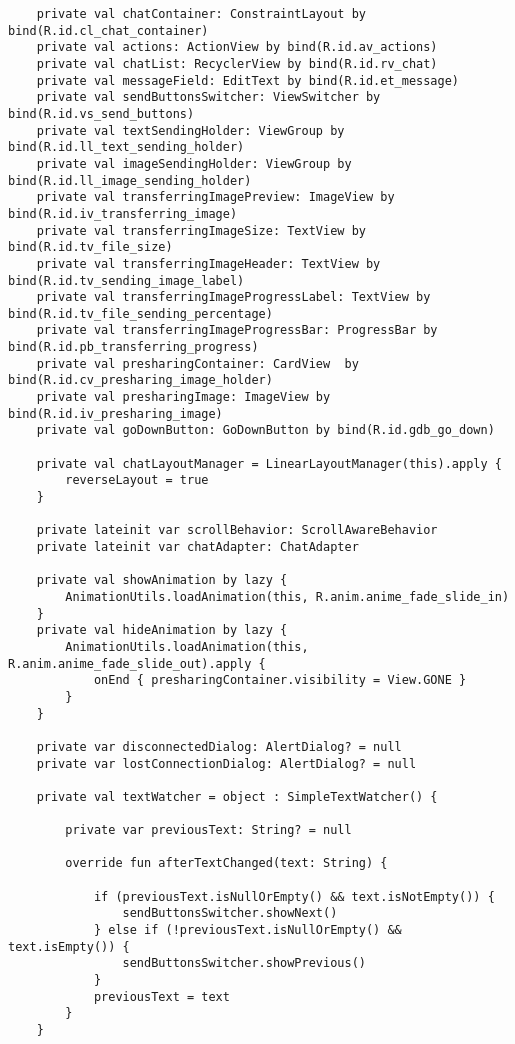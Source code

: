 \begin{lstlisting}
    private val chatContainer: ConstraintLayout by bind(R.id.cl_chat_container)
    private val actions: ActionView by bind(R.id.av_actions)
    private val chatList: RecyclerView by bind(R.id.rv_chat)
    private val messageField: EditText by bind(R.id.et_message)
    private val sendButtonsSwitcher: ViewSwitcher by bind(R.id.vs_send_buttons)
    private val textSendingHolder: ViewGroup by bind(R.id.ll_text_sending_holder)
    private val imageSendingHolder: ViewGroup by bind(R.id.ll_image_sending_holder)
    private val transferringImagePreview: ImageView by bind(R.id.iv_transferring_image)
    private val transferringImageSize: TextView by bind(R.id.tv_file_size)
    private val transferringImageHeader: TextView by bind(R.id.tv_sending_image_label)
    private val transferringImageProgressLabel: TextView by bind(R.id.tv_file_sending_percentage)
    private val transferringImageProgressBar: ProgressBar by bind(R.id.pb_transferring_progress)
    private val presharingContainer: CardView  by bind(R.id.cv_presharing_image_holder)
    private val presharingImage: ImageView by bind(R.id.iv_presharing_image)
    private val goDownButton: GoDownButton by bind(R.id.gdb_go_down)

    private val chatLayoutManager = LinearLayoutManager(this).apply {
        reverseLayout = true
    }

    private lateinit var scrollBehavior: ScrollAwareBehavior
    private lateinit var chatAdapter: ChatAdapter

    private val showAnimation by lazy {
        AnimationUtils.loadAnimation(this, R.anim.anime_fade_slide_in)
    }
    private val hideAnimation by lazy {
        AnimationUtils.loadAnimation(this, R.anim.anime_fade_slide_out).apply {
            onEnd { presharingContainer.visibility = View.GONE }
        }
    }

    private var disconnectedDialog: AlertDialog? = null
    private var lostConnectionDialog: AlertDialog? = null

    private val textWatcher = object : SimpleTextWatcher() {

        private var previousText: String? = null

        override fun afterTextChanged(text: String) {

            if (previousText.isNullOrEmpty() && text.isNotEmpty()) {
                sendButtonsSwitcher.showNext()
            } else if (!previousText.isNullOrEmpty() && text.isEmpty()) {
                sendButtonsSwitcher.showPrevious()
            }
            previousText = text
        }
    }


\end{lstlisting}
